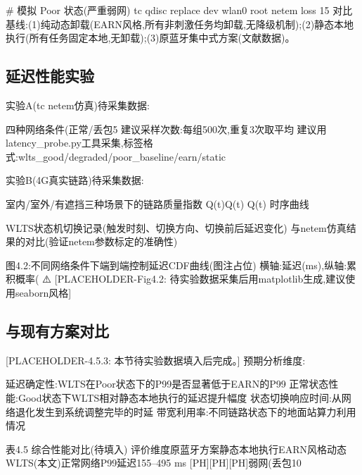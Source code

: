 # 模拟 Poor 状态(严重弱网)
tc qdisc replace dev wlan0 root netem loss 15%
对比基线:(1)纯动态卸载(EARN风格,所有非刺激任务均卸载,无降级机制);(2)静态本地执行(所有任务固定本地,无卸载);(3)原蓝牙集中式方案(文献数据)。

\subsection{延迟性能实验}

实验A(tc netem仿真)待采集数据:

四种网络条件(正常/丢包5%
建议采样次数:每组500次,重复3次取平均
建议用latency_probe.py工具采集,标签格式:wlts_good/degraded/poor_baseline/earn/static

实验B(4G真实链路)待采集数据:

室内/室外/有遮挡三种场景下的链路质量指数 Q(t)Q(t)
Q(t) 时序曲线

WLTS状态机切换记录(触发时刻、切换方向、切换前后延迟变化)
与netem仿真结果的对比(验证netem参数标定的准确性)



图4.2:不同网络条件下端到端控制延迟CDF曲线(图注占位)
横轴:延迟(ms),纵轴:累积概率(%
⚠️ [PLACEHOLDER-Fig4.2: 待实验数据采集后用matplotlib生成,建议使用seaborn风格]

\subsection{与现有方案对比}
[PLACEHOLDER-4.5.3: 本节待实验数据填入后完成。]
预期分析维度:

延迟确定性:WLTS在Poor状态下的P99是否显著低于EARN的P99
正常状态性能:Good状态下WLTS相对静态本地执行的延迟提升幅度
状态切换响应时间:从网络退化发生到系统调整完毕的时延
带宽利用率:不同链路状态下的地面站算力利用情况


表4.5 综合性能对比(待填入)
评价维度原蓝牙方案静态本地执行EARN风格动态WLTS(本文)正常网络P99延迟155–495 ms \cite{zhang2019bci}[PH][PH][PH]弱网(丢包10%


